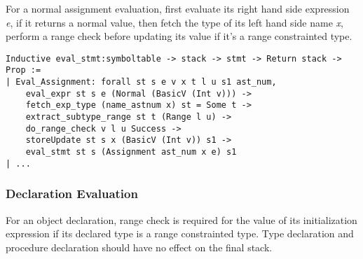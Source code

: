 For a normal assignment evaluation, first evaluate its right hand side
expression \textit{e}, if it returns a normal value, then fetch the type of
its left hand side name \textit{x}, perform a range check before updating
its value if it's a range constrainted type.

\begin{lstlisting}[escapechar=\#, language=coq, basicstyle=\small]
Inductive eval_stmt:symboltable -> stack -> stmt -> Return stack -> Prop :=
| Eval_Assignment: forall st s e v x t l u s1 ast_num,
    eval_expr st s e (Normal (BasicV (Int v))) ->
    fetch_exp_type (name_astnum x) st = Some t ->
    extract_subtype_range st t (Range l u) ->
    do_range_check v l u Success ->
    storeUpdate st s x (BasicV (Int v)) s1 ->
    eval_stmt st s (Assignment ast_num x e) s1
| ...
\end{lstlisting}

\subsubsection{Declaration Evaluation}
For an object declaration, range check is required for the value of its
initialization expression if its declared type is a range constrainted type.
Type declaration and procedure declaration should have no effect on the final
stack.












